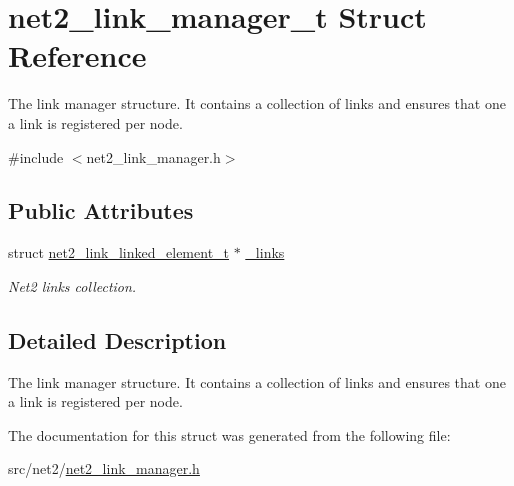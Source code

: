 \hypertarget{structnet2__link__manager__t}{\section{net2\-\_\-link\-\_\-manager\-\_\-t Struct Reference}
\label{structnet2__link__manager__t}
}


The link manager structure. It contains a collection of links and ensures that one a link is registered per node.  




{\ttfamily \#include $<$net2\-\_\-link\-\_\-manager.\-h$>$}

\subsection*{Public Attributes}
\begin{DoxyCompactItemize}
\item 
\hypertarget{structnet2__link__manager__t_af6acfc2ac12140909d049f52d881d78a}{struct \hyperlink{structnet2__link__linked__element__t}{net2\-\_\-link\-\_\-linked\-\_\-element\-\_\-t} $\ast$ \hyperlink{structnet2__link__manager__t_af6acfc2ac12140909d049f52d881d78a}{\-\_\-links}}\label{structnet2__link__manager__t_af6acfc2ac12140909d049f52d881d78a}

\begin{DoxyCompactList}\small\item\em Net2 links collection. \end{DoxyCompactList}\end{DoxyCompactItemize}


\subsection{Detailed Description}
The link manager structure. It contains a collection of links and ensures that one a link is registered per node. 

The documentation for this struct was generated from the following file\-:\begin{DoxyCompactItemize}
\item 
src/net2/\hyperlink{net2__link__manager_8h}{net2\-\_\-link\-\_\-manager.\-h}\end{DoxyCompactItemize}
